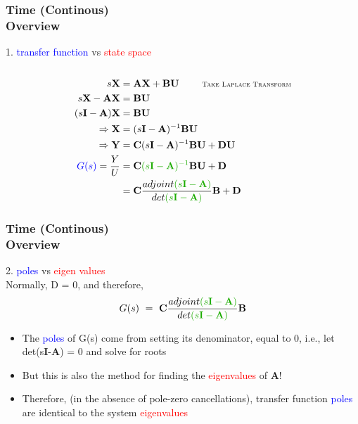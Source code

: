 \documentclass[hyperref={pdfpagelabels=true}]{beamer}
\begin{document}
\begin{frame}
\frametitle{Time (Continous) \\ {\large Overview}}
1. \textcolor{blue}{transfer function} vs \textcolor{red}{state space} \\
 \\
\centering
\small{
\begin{align*}
s{\bf X} &= {\bf A}{\bf X} + {\bf B}{\bf U} \ \qquad \text{\sc \scriptsize{Take Laplace Transform}}\\
s{\bf X} - {\bf A}{\bf X} &= {\bf B}{\bf U}\\
(s{\bf I}-{\bf A}){\bf X} &= {\bf B}{\bf U}\\
\Rightarrow  {\bf X} &= (s{\bf I}-{\bf A})^{-1}{\bf BU}\\
\Rightarrow  {\bf Y} &= {\bf C}(s{\bf I}-{\bf A})^{-1}{\bf BU} + {\bf DU}\\
\textcolor{blue}{G(s)} = \frac{Y}{U} &= {\bf C}\textcolor{mygreen}{(s{\bf I}-{\bf A})^{-1}}{\bf BU} + {\bf D} \\
 &= {\bf C}\frac{adjoint\textcolor{mygreen}{(s{\bf I}-{\bf A})}}{det\textcolor{mygreen}{(s{\bf I}-{\bf A})}}{\bf B} + {\bf D}
\end{align*}}
\end{frame}

\begin{frame}
\frametitle{Time (Continous) \\ {\large Overview}}
2.  \textcolor{blue}{poles} vs \textcolor{red}{eigen values}\\ \vfill
Normally, D = 0, and therefore,
$$G(s)\ = \ {\bf C}\frac{adjoint\textcolor{mygreen}{(s{\bf I}-{\bf A})}}{det\textcolor{mygreen}{(s{\bf I}-{\bf A})}}{\bf B}$$
\begin{itemize}
\item The \textcolor{blue}{poles} of G(s) come from setting its denominator, equal to 0, i.e., let det\textcolor{mygreen}{(s{\bf I}-{\bf A})} = 0 and solve for roots
\item But this is also the method for finding the
\textcolor{red}{eigenvalues} of {\bf A}!
\item Therefore, (in the absence of pole-zero
cancellations), transfer function \textcolor{blue}{poles} are identical
to the system \textcolor{red}{eigenvalues}

\end{itemize}
\end{frame}
\end{document}
